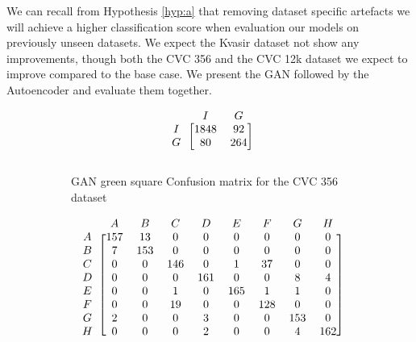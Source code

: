 We can recall from Hypothesis \ref{hyp:a} that removing dataset specific artefacts we will achieve a higher classification score when evaluation our models on previously unseen datasets.
We expect the Kvasir dataset not show any improvements, though both the CVC 356 and the CVC 12k dataset we expect to improve compared to the base case. 
We present the GAN followed by the Autoencoder and evaluate them together.


\begin{figure}[h]
\myfontsize
\caption*{\footnotesize \textmd{ \textbf{A}:{dyed-lifted-polyps} , \textbf{B}:{dyed-resection-margins} , \textbf{C}:{esophagitis} , \textbf{D}:{normal-cecum} , \textbf{E}:{normal-pylorus} , \textbf{F}:{normal-z-line} , \textbf{G}:{polyps} , \textbf{H}:{ulcerative-colitis} , \textbf{I}:{non-polyp}}}

\begin{subfigure}[b]{0.25\textwidth}
     
\[
\begin{blockarray}{ccc}
& I & G  \\
\begin{block}{c[cc]}
        I&1848 &  92\\
        G& 80 &  264\\
\end{block}
\end{blockarray}
 \]         

\caption{GAN green square Confusion matrix for the CVC 356 dataset}
\label{mat:cvc356_CM_DN121_GAN_SQUARE}
\end{subfigure}
\begin{subfigure}[b]{0.49\textwidth}  
\scriptsize     
\[
\begin{blockarray}{ccccccccc}
& A & B & C & D & E & F & G & H \\
\begin{block}{c[cccccccc]}
A&157 & 13 & 0 & 0 & 0 & 0 & 0 & 0\\
B&  7 & 153 & 0 & 0 & 0 & 0 & 0 & 0\\
C&  0 & 0 & 146 & 0 & 1 & 37 & 0 & 0\\
D&  0 & 0 & 0 & 161 & 0 & 0 & 8 & 4\\
E&  0 & 0 & 1 & 0 & 165 & 1 & 1 & 0\\
F&  0 & 0 & 19 & 0 & 0 & 128 & 0 & 0\\
G&  2 & 0 & 0 & 3 & 0 & 0 & 153 & 0\\
H&  0 & 0 & 0 & 2 & 0 & 0 & 4 & 162\\
\end{block}
\end{blockarray}
 \]        
        

\end{subfigure}
\end{figure}
